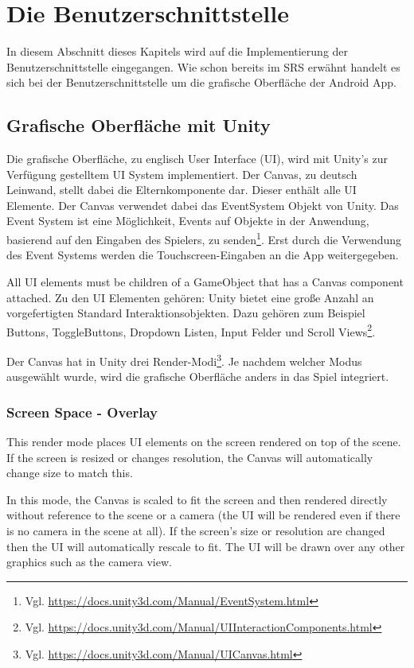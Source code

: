 \section{Die Benutzerschnittstelle}
	In diesem Abschnitt dieses Kapitels wird auf die Implementierung der Benutzerschnittstelle eingegangen. Wie schon bereits im SRS erwähnt handelt es sich bei der Benutzerschnittstelle um die grafische Oberfläche der Android App. 
	
	\subsection{Grafische Oberfläche mit Unity}
		Die grafische Oberfläche, zu englisch User Interface (UI), wird mit Unity's zur Verfügung gestelltem UI System implementiert. Der Canvas, zu deutsch Leinwand, stellt dabei die Elternkomponente dar. Dieser enthält alle UI Elemente. Der Canvas verwendet dabei das EventSystem Objekt von Unity. Das Event System  ist eine Möglichkeit, Events auf Objekte in der Anwendung, basierend auf den Eingaben des Spielers, zu senden\footnote{Vgl. \url{https://docs.unity3d.com/Manual/EventSystem.html}}. Erst durch die Verwendung des Event Systems werden die Touchscreen-Eingaben an die App weitergegeben.
		
		All UI elements must be children of a GameObject that has a Canvas component attached. Zu den UI Elementen gehören: Unity bietet eine große Anzahl an vorgefertigten Standard Interaktionsobjekten. Dazu gehören zum Beispiel Buttons, ToggleButtons, Dropdown Listen, Input Felder und Scroll Views\footnote{Vgl. \url{https://docs.unity3d.com/Manual/UIInteractionComponents.html}}.
		
		Der Canvas hat in Unity drei Render-Modi\footnote{Vgl. \url{https://docs.unity3d.com/Manual/UICanvas.html}}. Je nachdem welcher Modus ausgewählt wurde, wird die grafische Oberfläche anders in das Spiel integriert.
		
		\subsubsection{Screen Space - Overlay}
			This render mode places UI elements on the screen rendered on top of the scene. If the screen is resized or changes resolution, the Canvas will automatically change size to match this.
			
			In this mode, the Canvas is scaled to fit the screen and then rendered directly without reference to the scene or a camera (the UI will be rendered even if there is no camera in the scene at all). If the screen’s size or resolution are changed then the UI will automatically rescale to fit. The UI will be drawn over any other graphics such as the camera view.
		

